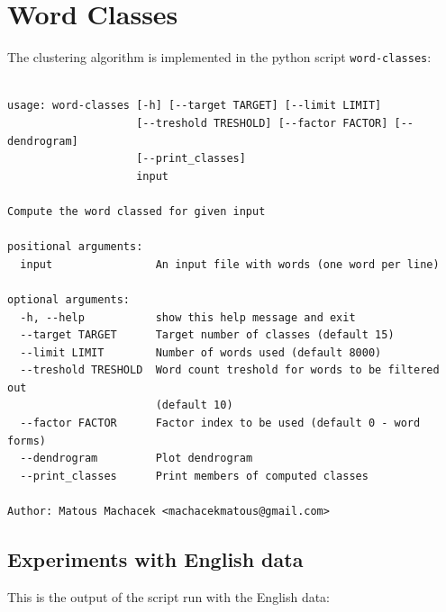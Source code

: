 \documentclass[12pt,a4paper]{article}
\begin{document}
\section{Word Classes}
The clustering algorithm is implemented in the python script \texttt{word-classes}:
\begin{verbatim}

usage: word-classes [-h] [--target TARGET] [--limit LIMIT]
                    [--treshold TRESHOLD] [--factor FACTOR] [--dendrogram]
                    [--print_classes]
                    input

Compute the word classed for given input

positional arguments:
  input                An input file with words (one word per line)

optional arguments:
  -h, --help           show this help message and exit
  --target TARGET      Target number of classes (default 15)
  --limit LIMIT        Number of words used (default 8000)
  --treshold TRESHOLD  Word count treshold for words to be filtered out
                       (default 10)
  --factor FACTOR      Factor index to be used (default 0 - word forms)
  --dendrogram         Plot dendrogram
  --print_classes      Print members of computed classes

Author: Matous Machacek <machacekmatous@gmail.com>
\end{verbatim}

\subsection{Experiments with English data}

This is the output of the script run with the English data:
\end{document}
